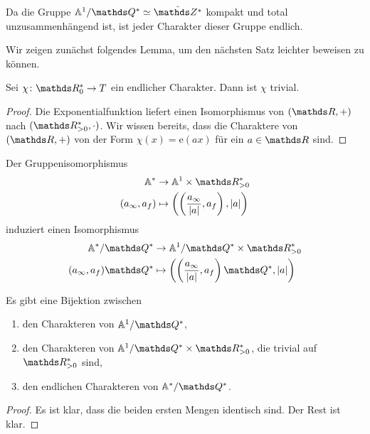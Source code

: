 Da die Gruppe $\A^1/\Q^\ast\simeq \hat{\Z^\ast}$ kompakt und total unzusammenhängend ist, ist jeder Charakter dieser Gruppe endlich.

Wir zeigen zunächst folgendes Lemma, um den nächsten Satz leichter beweisen zu können.
\begin{lem}
Sei $\chi \colon \R_0^\ast \to T$ ein endlicher Charakter.
Dann ist $\chi$ trivial.
\end{lem}
\begin{proof}
Die Exponentialfunktion liefert einen Isomorphismus von $(\R,+)$ nach $(\R_{>0}^\ast,\cdot)$.
Wir wissen bereits, dass die Charaktere von $(\R,+)$ von der Form $\chi(x)=\mathrm{e}(ax)$ für ein $a\in \R$ sind.
\end{proof}

Der Gruppenisomorphismus
\begin{align*}
\A^\ast &\to \A^1 \times \R_{>0}^\ast\\
(a_\infty,a_f)&\mapsto \left( \left( \frac{a_\infty}{\abs{a}},a_f\right),\abs{a}\right)
\end{align*}
induziert einen Isomorphismus
\begin{align*}
\A^\ast/\Q^\ast &\to \A^1/\Q^\ast \times \R_{>0}^\ast\\
(a_\infty,a_f)\Q^\ast&\mapsto \left( \left( \frac{a_\infty}{\abs{a}},a_f\right)\Q^\ast,\abs{a}\right)
\end{align*}

\begin{prop}
Es gibt eine Bijektion zwischen
\begin{enumerate}[label=\roman*)]
\item den Charakteren von $\A^1/\Q^\ast$,
\item den Charakteren von $\A^1/\Q^\ast \times \R_{>0}^\ast$, die trivial auf $\R_{>0}^\ast$ sind,
\item den endlichen Charakteren von $\A^\ast/\Q^\ast$.
\end{enumerate}
\end{prop}
\begin{proof}
Es ist klar, dass die beiden ersten Mengen identisch sind.
Der Rest ist klar.
\end{proof}

